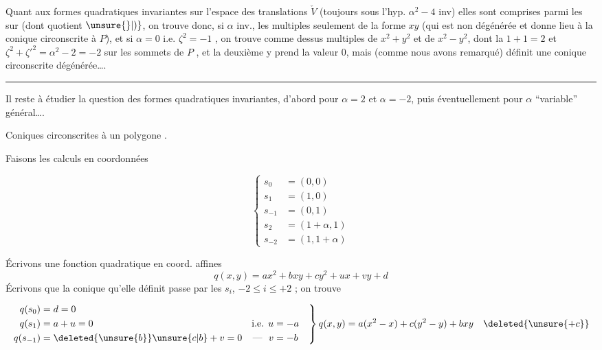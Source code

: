 Quant aux formes quadratiques invariantes  sur
l'espace des translations $\check V$ (toujours sous l'hyp.
$\alpha^2-4$ inv) elles sont comprises parmi les
 sur  (dont  quotient $\unsure{\}|)}$,
on trouve donc, si $\alpha$ inv., les multiples
seulement de la forme $xy$ (qui est non
dégénérée et donne lieu à la conique circonscrite
à $P$), et si $\alpha=0$ i.e. 
${\zeta}^2=-1$ , on trouve comme dessus 
multiples de $x^2+y^2$ et de $x^2-y^2$, dont
la 
$1+1=2$ et $\zeta^2+{\zeta'}^2=\alpha^2-2=-2$ sur les sommets
de $P$ , et la deuxième y prend la valeur $0$,
mais (comme nous avons remarqué) définit une
conique circonscrite dégénérée\ldots .

\begin{center}\rule{1.6cm}{0.3pt}\end{center}

Il reste à étudier la question des formes
quadratiques invariantes, d'abord pour $\alpha=2$
et $\alpha=-2$, puis éventuellement pour $\alpha$
``variable'' général\ldots .


Coniques circonscrites à un polygone .

Faisons les calculs en coordonnées 

\[
\left\{\begin{aligned}
s_0&=(0,0)\\
s_1&=(1,0)\\
s_{-1}&=(0,1)\\
s_2&=(1+\alpha,1)\\
s_{-2}&=(1,1+\alpha)
\end{aligned}\right. \tag*{(1)}
\]

Écrivons une fonction quadratique  en coord. affines
\[
q(x,y)=ax^2+bxy+cy^2+ux+vy+d
\]
 Écrivons que  la conique qu'elle définit
passe par les  $s_i$, $-2\le i\le +2$ ; on trouve

\[
\left.\begin{aligned}
q(s_0)&=d=0\\
q(s_1)&=a+u=0&\text{i.e. }u&=-a\\
q(s_{-1})&=\deleted{\unsure{b}}\unsure{c|b}+v=0&\text{--- }\ v&=-b
\end{aligned}\right\}
q(x,y)=a(x^2-x)+c(y^2-y)+bxy\quad\deleted{\unsure{+c}}
\]

